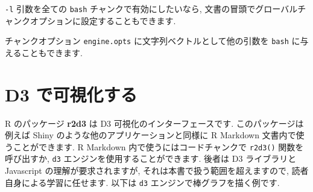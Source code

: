 \documentclass[
  11pt,
  lualatex,
  ja=standard]{bxjsreport}
\newenvironment{Shaded}{\begin{snugshade}}{\end{snugshade}}
\newcommand{\AttributeTok}[1]{\textcolor[rgb]{0.77,0.63,0.00}{#1}}
\newcommand{\FunctionTok}[1]{\textcolor[rgb]{0.00,0.00,0.00}{#1}}
\newcommand{\InformationTok}[1]{\textcolor[rgb]{0.56,0.35,0.01}{\textbf{\textit{#1}}}}
\newcommand{\NormalTok}[1]{#1}
\newcommand{\SpecialCharTok}[1]{\textcolor[rgb]{0.00,0.00,0.00}{#1}}
\newcommand{\StringTok}[1]{\textcolor[rgb]{0.31,0.60,0.02}{#1}}
\begin{document}
\begin{Shaded}
\end{Shaded}

\texttt{-l} 引数を全ての \texttt{bash} チャンクで有効にしたいなら, 文書の冒頭でグローバルチャンクオプションに設定することもできます.

\begin{Shaded}
\end{Shaded}

チャンクオプション \texttt{engine.opts} に文字列ベクトルとして他の引数を \texttt{bash} に与えることもできます.

\hypertarget{d3}{%
\section{D3 で可視化する}\label{d3}}

R のパッケージ \textbf{r2d3} \autocite{R-r2d3} は D3 可視化のインターフェースです. このパッケージは例えば Shiny のような他のアプリケーションと同様に R Markdown 文書内で使うことができます. R Markdown 内で使うにはコードチャンクで \texttt{r2d3()} 関数を呼び出すか, \texttt{d3} エンジンを使用することができます. 後者は D3 ライブラリと Javascript の理解が要求されますが, それは本書で扱う範囲を超えますので, 読者自身による学習に任せます. 以下は \texttt{d3} エンジンで棒グラフを描く例です.
\end{document}
